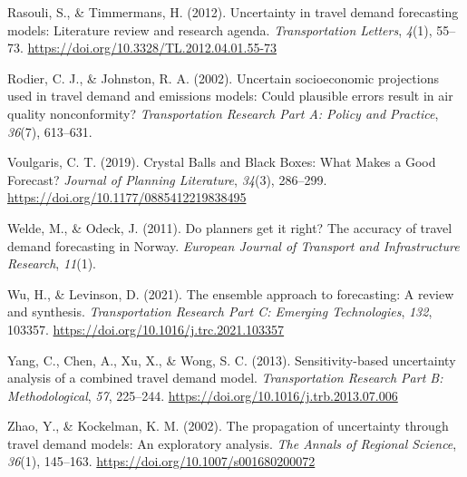 \documentclass[
  letterpaper,
  authoryear,
  review,
  3p]{elsarticle}
\newlength{\cslhangindent}
\newlength{\cslentryspacingunit} %
\newenvironment{CSLReferences}[2] %
 {%
  \setlength{\parindent}{0pt}
  \ifodd #1
  \let\oldpar\par
  \def\par{\hangindent=\cslhangindent\oldpar}
  \fi
  \setlength{\parskip}{#2\cslentryspacingunit}
 }%
 {}
\begin{document}
\begin{CSLReferences}{1}{0}
\leavevmode{}%
Rasouli, S., \& Timmermans, H. (2012). Uncertainty in travel demand
forecasting models: Literature review and research agenda.
\emph{Transportation Letters}, \emph{4}(1), 55--73.
\url{https://doi.org/10.3328/TL.2012.04.01.55-73}

\leavevmode{}%
Rodier, C. J., \& Johnston, R. A. (2002). Uncertain socioeconomic
projections used in travel demand and emissions models: Could plausible
errors result in air quality nonconformity? \emph{Transportation
Research Part A: Policy and Practice}, \emph{36}(7), 613--631.

\leavevmode{}%
Voulgaris, C. T. (2019). Crystal {Balls} and {Black Boxes}: {What Makes}
a {Good Forecast}? \emph{Journal of Planning Literature}, \emph{34}(3),
286--299. \url{https://doi.org/10.1177/0885412219838495}

\leavevmode{}%
Welde, M., \& Odeck, J. (2011). Do planners get it right? {The} accuracy
of travel demand forecasting in {Norway}. \emph{European Journal of
Transport and Infrastructure Research}, \emph{11}(1).

\leavevmode{}%
Wu, H., \& Levinson, D. (2021). The ensemble approach to forecasting:
{A} review and synthesis. \emph{Transportation Research Part C: Emerging
Technologies}, \emph{132}, 103357.
\url{https://doi.org/10.1016/j.trc.2021.103357}

\leavevmode{}%
Yang, C., Chen, A., Xu, X., \& Wong, S. C. (2013). Sensitivity-based
uncertainty analysis of a combined travel demand model.
\emph{Transportation Research Part B: Methodological}, \emph{57},
225--244. \url{https://doi.org/10.1016/j.trb.2013.07.006}

\leavevmode{}%
Zhao, Y., \& Kockelman, K. M. (2002). The propagation of uncertainty
through travel demand models: {An} exploratory analysis. \emph{The
Annals of Regional Science}, \emph{36}(1), 145--163.
\url{https://doi.org/10.1007/s001680200072}

\end{CSLReferences}
\end{document}
